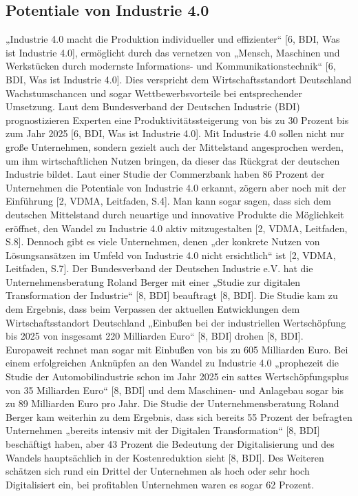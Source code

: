 \subsection{Potentiale von Industrie 4.0}\label{sec:PotentialeIndustrie4.0}
„Industrie 4.0 macht die Produktion individueller und effizienter“ [6, BDI, Was ist Industrie 4.0], ermöglicht durch das vernetzen von „Mensch, Maschinen und Werkstücken durch modernste Informations- und Kommunikationstechnik“ [6, BDI, Was ist Industrie 4.0]. Dies verspricht dem Wirtschaftsstandort Deutschland Wachstumschancen und sogar Wettbewerbsvorteile bei entsprechender Umsetzung. Laut dem Bundesverband der Deutschen Industrie (BDI) prognostizieren Experten eine Produktivitätssteigerung von bis zu 30 Prozent bis zum Jahr 2025 [6, BDI, Was ist Industrie 4.0].
\newline
Mit Industrie 4.0 sollen nicht nur große Unternehmen, sondern gezielt auch der Mittelstand angesprochen werden, um ihm wirtschaftlichen Nutzen bringen, da dieser das Rückgrat der deutschen Industrie bildet. Laut einer Studie der Commerzbank haben 86 Prozent der Unternehmen die Potentiale von Industrie 4.0 erkannt, zögern aber noch mit der Einführung [2, VDMA, Leitfaden, S.4]. Man kann sogar sagen, dass sich dem deutschen Mittelstand durch neuartige und innovative Produkte die Möglichkeit eröffnet, den Wandel zu Industrie 4.0 aktiv mitzugestalten [2, VDMA, Leitfaden, S.8]. Dennoch gibt es viele Unternehmen, denen „der konkrete Nutzen von Lösungsansätzen im Umfeld von Industrie 4.0 nicht ersichtlich“ ist [2, VDMA, Leitfaden, S.7]. 
\newline
Der Bundesverband der Deutschen Industrie e.V. hat die Unternehmensberatung Roland Berger mit einer „Studie zur digitalen Transformation der Industrie“ [8, BDI] beauftragt [8, BDI]. Die Studie kam zu dem Ergebnis, dass beim Verpassen der aktuellen Entwicklungen dem Wirtschaftsstandort Deutschland „Einbußen bei der industriellen Wertschöpfung bis 2025 von insgesamt 220 Milliarden Euro“ [8, BDI] drohen [8, BDI]. Europaweit rechnet man sogar mit Einbußen von bis zu 605 Milliarden Euro. Bei einem erfolgreichen Anknüpfen an den Wandel zu Industrie 4.0 „prophezeit die Studie der Automobilindustrie schon im Jahr 2025 ein sattes Wertschöpfungsplus von 35 Milliarden Euro“ [8, BDI] und dem Maschinen- und Anlagebau sogar bis zu 89 Milliarden Euro pro Jahr. Die Studie der Unternehmensberatung Roland Berger kam weiterhin zu dem Ergebnis, dass sich bereits 55 Prozent der befragten Unternehmen „bereits intensiv mit der Digitalen Transformation“ [8, BDI] beschäftigt haben, aber 43 Prozent die Bedeutung der Digitalisierung und des Wandels hauptsächlich in der Kostenreduktion sieht [8, BDI]. Des Weiteren schätzen sich rund ein Drittel der Unternehmen als hoch oder sehr hoch Digitalisiert ein, bei profitablen Unternehmen waren es sogar 62 Prozent.
